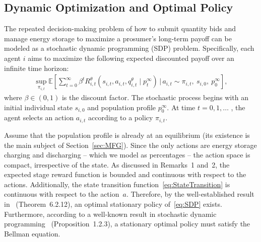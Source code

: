 \documentclass{article}
\theoremstyle{definition}
\theoremstyle{plain}
\begin{document}

\subsection{Dynamic Optimization and Optimal Policy} 
The repeated decision-making problem of how to submit quantity bids and manage energy storage to maximize a prosumer's  long-term payoff can be modeled as a stochastic dynamic programming (SDP) problem. Specifically, each agent $i$ aims to maximize the following expected discounted payoff over an infinite time horizon:
\small
\begin{align}
\sup_{\pi_{i,t}}  \mathbb{E}\left[\sum_{t=0}^{\infty} \beta^t 
R^{\theta}_{i,t}(s_{i,t}, a_{i,t}, q^{\theta}_{i,t} \mid p^{\infty}_{t}) \,\bigg|\, a_{i,t} \sim \pi_{i,t},\ s_{i,0},\  p^{\infty}_{0}\right],   \label{eq:SDP}
\end{align}
\normalsize
where $\beta \in (0,1)$ is the discount factor. The stochastic process begins with an initial individual state \( s_{i,0} \) and population profile \( p^{\infty}_{0} \). At time $t = 0, 1, \ldots$ , the agent selects an action \( a_{i,t} \) according to a policy \( \pi_{i,t} \).


Assume that the population profile is already at an equilibrium (its existence is the main subject of Section~\ref{sec:MFG}). Since the only actions are energy storage charging and discharging -- which we model as percentages -- the action space is compact, irrespective of the state. As discussed in Remarks~1 and~2, the expected stage reward function is bounded and continuous with respect to the actions. Additionally, the state transition function~\eqref{eq:StateTransition} is continuous with respect to the action~$a$. Therefore, by the well-established result in~\cite{Puterman_MDP} (Theorem~6.2.12), an optimal stationary policy of~\eqref{eq:SDP} exists. Furthermore, according to a well-known result in stochastic dynamic programming~\cite{BertsekasDP} (Proposition~1.2.3), a stationary optimal policy must satisfy the Bellman equation.
\end{document}

